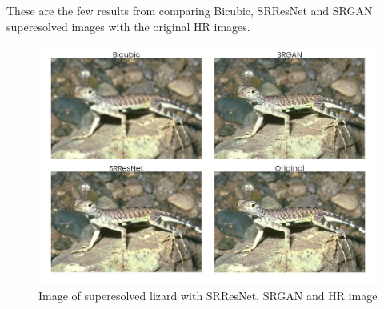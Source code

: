 \clearpage
\newpage
    These are the few results from comparing Bicubic, SRResNet and SRGAN superesolved images with the original HR images.
    \begin{figure}[t]
        \centering
        \includegraphics[width=5.5in]{./figures/examples/lizard.jpg}
        \caption{Image of superesolved lizard with SRResNet, SRGAN and HR image}
    \end{figure}
